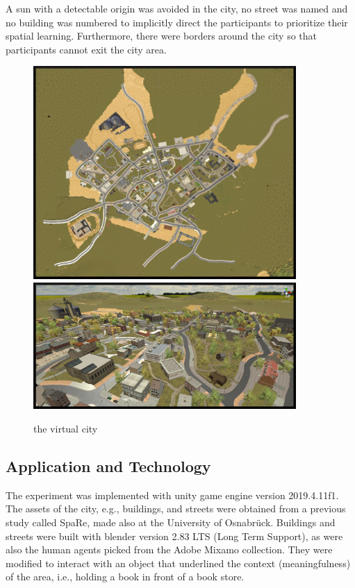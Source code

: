 A sun with a detectable origin was avoided in the city, no street was named and no building was numbered to implicitly direct the participants to prioritize their spatial learning. Furthermore, there were borders around the city so that participants cannot exit the city area.

\begin{figure}[!htb]
	\centering
	\includegraphics[width=100mm]{figures/city.jpg}
	\includegraphics[width=100mm]{figures/city_1.jpg}
	\caption[The virtual city]{the virtual city}
	\label{fig:city}
\end{figure}

\subsection{Application and Technology}

The experiment was implemented with unity game engine \autocite{haas2014history} version 2019.4.11f1. The assets of the city, e.g., buildings, and streets were obtained from a previous study called SpaRe, made also at the University of Osnabrück. Buildings and streets were built with blender \autocite{Hess:2010:BFE:1893021} version 2.83 LTS (Long Term Support), as were also the human agents picked from the Adobe Mixamo \autocite{mixamo} collection. They were modified to interact with an object that underlined the context (meaningfulness) of the area, i.e., holding a book in front of a book store. 

